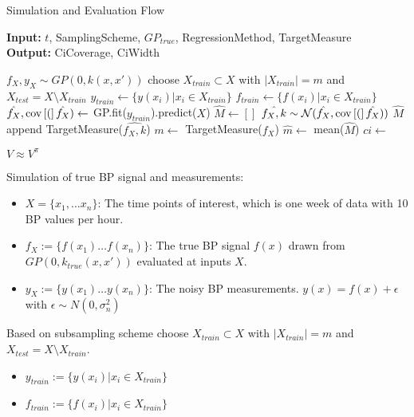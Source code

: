 \begin{algorithm} \caption{Simulation and Evaluation Flow}
 \hspace*{\algorithmicindent} \textbf{Input:} $t$, SamplingScheme, $GP_{true}$,
RegressionMethod, TargetMeasure\\
 \hspace*{\algorithmicindent} \textbf{Output:} CiCoverage, CiWidth
\begin{algorithmic}[1]

        \State $f_X, y_X \sim GP(0, k(x,x'))$
        \State choose $X_{train} \subset X$ with $|X_{train}| = m$ and $X_{test} = X \setminus X_{train}$
        \State $y_{train} \gets \{y(x_i) | x_i \in X_{train}\}$
        \State $f_{train} \gets \{f(x_i) | x_i \in X_{train}\}$
        \State $\hat{f_X}, \COV(\hat{f_X}) \gets$ GP.fit($y_{train}$).predict($X$)
        \State $\hat{M} \gets []$
            \State $\hat{f_X, k}  \sim \N(\hat{f_X}, \COV(\hat{f_X})) $
            \State $\hat{M}$ append  TargetMeasure($\hat{f_X, k}$)
        \State $m \gets$ TargetMeasure($f_X$)
        \State $\hat{m} \gets$ mean($\hat{M}$)
        \State $ci \gets $
        \EndFor

    \EndFor
    \Ensure $V \approx V^\pi$
\end{algorithmic}
\end{algorithm}


Simulation of true BP signal and measurements:
    \begin{itemize}
        \item $X=\{x_1, \dots x_n\}$: The time points of interest, which is one week of data with 10 BP values per hour.
        \item $f_X := \{f(x_1) \dots f(x_n)\}$: The true BP signal $f(x)$ drawn from $GP(0, k_{true}(x,x'))$ evaluated at inputs $X$.
        \item $y_X := \{y(x_1) \dots y(x_n)\}$: The noisy BP measurements. $y(x)= f(x) + \epsilon$ with $\epsilon \sim N(0, \sigma_n^2)$
    \end{itemize}

Based on subsampling scheme choose $X_{train} \subset X$ with $|X_{train}| = m$ and $X_{test} = X \setminus X_{train}$.
\begin{itemize}
    \item $y_{train} := \{y(x_i) | x_i \in X_{train}\}$
    \item  $f_{train} := \{f(x_i) | x_i \in X_{train}\}$
\end{itemize}


